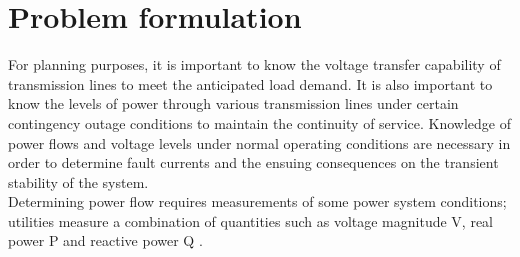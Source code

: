 \chapter{Problem formulation}

For planning purposes, it is important to know the voltage transfer capability of transmission lines to meet the anticipated load demand. It is also important to know the levels of power through various transmission lines under certain contingency outage conditions to maintain the continuity of service. Knowledge of power flows and voltage levels under normal operating conditions are necessary in order to determine fault currents and the ensuing consequences on the transient stability of the system. \\
Determining power flow requires measurements of some power system conditions; utilities measure a combination of quantities such as voltage magnitude \gls{V}, real power \gls{P} and reactive power \gls{Q} \cite{eps}.


